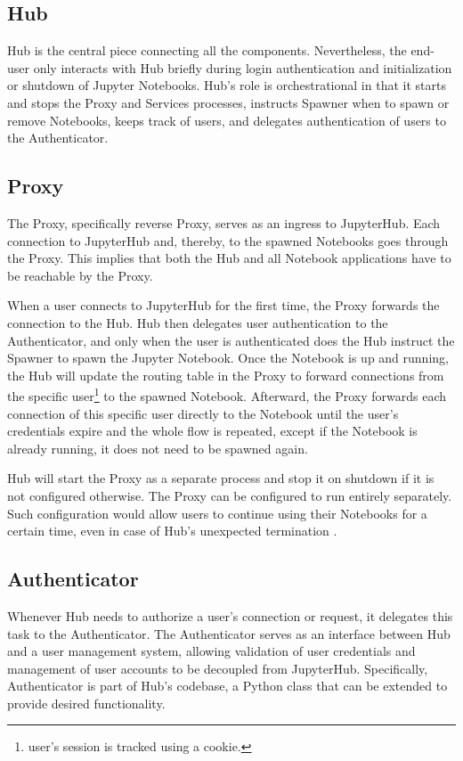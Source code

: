 \documentclass[
  digital,     %
  oneside,     %
  nosansbold,  %
  nocolorbold, %
  lof,         %
  lot,         %
]{fithesis4}
\begin{document}
\subsection{Hub}
Hub is the central piece connecting all the components. Nevertheless, the end-user only interacts with Hub briefly during login authentication and initialization or shutdown of Jupyter Notebooks. Hub's role is orchestrational in that it starts and stops the Proxy and Services processes, instructs Spawner when to spawn or remove Notebooks, keeps track of users, and delegates authentication of users to the Authenticator.

\subsection{Proxy}
The Proxy, specifically reverse Proxy, serves as an ingress to JupyterHub. Each connection to JupyterHub and, thereby, to the spawned Notebooks goes through the Proxy. This implies that both the Hub and all Notebook applications have to be reachable by the Proxy\cite{jupyterhub_arch}.

When a user connects to JupyterHub for the first time, the Proxy forwards the connection to the Hub. Hub then delegates user authentication to the Authenticator, and only when the user is authenticated does the Hub instruct the Spawner to spawn the Jupyter Notebook. Once the Notebook is up and running, the Hub will update the routing table in the Proxy to forward connections from the specific user\footnote{user's session is tracked using a cookie.} to the spawned Notebook. Afterward, the Proxy forwards each connection of this specific user directly to the Notebook until the user's credentials expire and the whole flow is repeated, except if the Notebook is already running, it does not need to be spawned again.

Hub will start the Proxy as a separate process and stop it on shutdown if it is not configured otherwise. The Proxy can be configured to run entirely separately. Such configuration would allow users to continue using their Notebooks for a certain time, even in case of Hub's unexpected termination \cite{jupyterhub_arch}.

\subsection{Authenticator}
\label{subsec:jupyterhub:authenticator}

Whenever Hub needs to authorize a user's connection or request, it delegates this task to the Authenticator. The Authenticator serves as an interface between Hub and a user management system, allowing validation of user credentials and management of user accounts to be decoupled from JupyterHub. Specifically, Authenticator is part of Hub's codebase, a Python class that can be extended to provide desired functionality.
\end{document}
